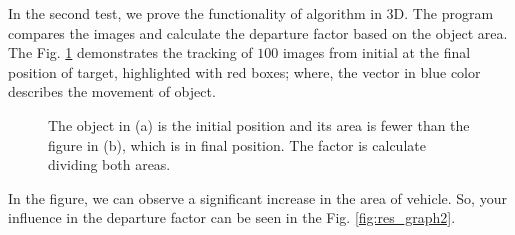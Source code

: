 In the second test, we prove the functionality of algorithm in 3D. 
The program compares the images and calculate the departure factor 
based on the object area. The Fig. \ref{fig:target} demonstrates the 
tracking of $100$ images from initial at the final position of target, 
highlighted with red boxes;
where, the vector in blue color describes the movement of object. 
\begin{figure}[!hbt]
\centering
  \caption{The object in (a) is the initial position and its area is 
  fewer than the figure in (b), which is in final position. 
  The factor is calculate dividing both areas.}
  \label{fig:target}
\end{figure}
In the figure, we can observe a significant increase in the area of vehicle. 
So, your influence in the departure factor can be seen in the Fig. \ref{fig:res_graph2}.

